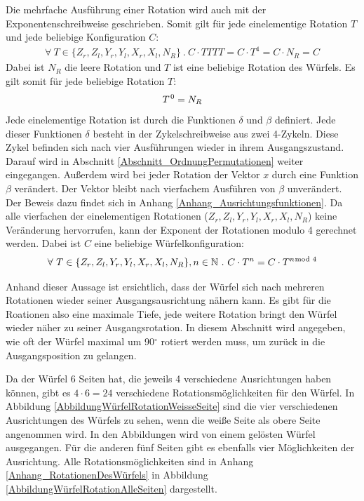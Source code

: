 \documentclass[12pt,a4paper, usenames, dvipsnames]{article}
\theoremstyle{mystyle}
\theoremstyle{definition}
\begin{document}
Die mehrfache Ausführung einer Rotation wird auch mit der Exponentenschreibweise geschrieben. 
Somit gilt für jede einelementige Rotation $T$ und jede beliebige Konfiguration $C$: 
\begin{align*}
\forall \ T \in \{{Z_r}, {Z_l}, {Y_r}, {Y_l}, {X_r}, {X_l} , N_R \} \ . \  C \cdot TTTT= C \cdot T^4=C \cdot N_R = C 
\end{align*} 
Dabei ist $N_R$ die leere Rotation und $T$ ist eine beliebige Rotation des Würfels. Es gilt somit für jede beliebige Rotation $T$:
\begin{align*}
T^{\hspace*{0.1em}0}=N_R
\end{align*}
Jede einelementige Rotation ist durch die Funktionen $\delta$ und $\beta$ definiert. Jede dieser Funktionen $\delta$ besteht in der Zykelschreibweise aus zwei 4-Zykeln. Diese Zykel befinden sich nach vier Ausführungen wieder in ihrem Ausgangszustand. Darauf wird in Abschnitt \ref{Abschnitt_OrdnungPermutationen} weiter eingegangen. Außerdem wird bei jeder Rotation der Vektor $x$ durch eine Funktion $\beta$ verändert. Der Vektor bleibt nach vierfachem Ausführen von $\beta$ unverändert. Der Beweis dazu findet sich in Anhang \ref{Anhang_Ausrichtungsfunktionen}.
Da alle vierfachen der einelementigen Rotationen (${Z_r}, {Z_l}, {Y_r}, {Y_l}, {X_r}, {X_l} , N_R$) keine Veränderung hervorrufen, kann der Exponent der Rotationen modulo 4 gerechnet werden. Dabei ist $C$ eine beliebige Würfelkonfiguration:
\begin{align*}
\forall \ T \in \{{Z_r}, {Z_l}, {Y_r}, {Y_l}, {X_r}, {X_l}, N_R \}, n \in \mathbb{N} \ . \ C \cdot T^n=C \cdot T^{n \hspace*{-0.5em} \mod 4}
\end{align*}

Anhand dieser Aussage ist ersichtlich, dass der Würfel sich nach mehreren Rotationen wieder seiner Ausgangsausrichtung nähern kann. Es gibt für die Roationen also eine maximale Tiefe, jede weitere Rotation bringt den Würfel wieder näher zu seiner Ausgangsrotation.
In diesem Abschnitt wird angegeben, wie oft der Würfel maximal um 90$^\circ$ rotiert werden muss, um zurück in die Ausgangsposition zu gelangen.

Da der Würfel 6 Seiten hat, die jeweils 4 verschiedene Ausrichtungen haben können, gibt es $4 \cdot 6 = 24$ verschiedene Rotationsmöglichkeiten für den Würfel. In Abbildung \ref{AbbildungWürfelRotationWeisseSeite} sind die vier verschiedenen Ausrichtungen des Würfels zu sehen, wenn die weiße Seite als obere Seite angenommen wird. In den Abbildungen wird von einem gelösten Würfel ausgegangen. Für die anderen fünf Seiten gibt es ebenfalls vier Möglichkeiten der Ausrichtung. Alle Rotationsmöglichkeiten sind in Anhang \ref{Anhang_RotationenDesWürfels} in Abbildung \ref{AbbildungWürfelRotationAlleSeiten} dargestellt.
\end{document}
